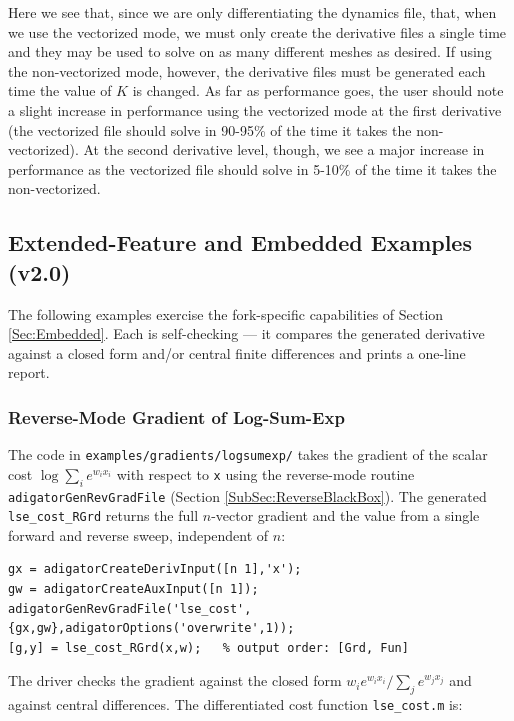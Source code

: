 \documentclass[10pt,pdftex]{article}
\begin{document}
Here we see that, since we are only differentiating the dynamics file, that, when we use the vectorized mode, we must only create the derivative files a single time and they may be used to solve on as many different meshes as desired. If using the non-vectorized mode, however, the derivative files must be generated each time the value of $K$ is changed. As far as performance goes, the user should note a slight increase in performance using the vectorized mode at the first derivative (the vectorized file should solve in 90-95\% of the time it takes the non-vectorized). At the second derivative level, though, we see a major increase in performance as the vectorized file should solve in 5-10\% of the time it takes the non-vectorized.

\subsection{Extended-Feature and Embedded Examples (v2.0)}
The following examples exercise the fork-specific capabilities of Section \ref{Sec:Embedded}. Each is self-checking --- it compares the generated derivative against a closed form and/or central finite differences and prints a one-line report.

\subsubsection{Reverse-Mode Gradient of Log-Sum-Exp}
The code in \texttt{examples/gradients/logsumexp/} takes the gradient of the scalar cost $\log\sum_i e^{w_i x_i}$ with respect to \texttt{x} using the reverse-mode routine \texttt{adigatorGenRevGradFile} (Section \ref{SubSec:ReverseBlackBox}). The generated \texttt{lse\_cost\_RGrd} returns the full $n$-vector gradient and the value from a single forward and reverse sweep, independent of $n$:
\begin{verbatim}
gx = adigatorCreateDerivInput([n 1],'x');
gw = adigatorCreateAuxInput([n 1]);
adigatorGenRevGradFile('lse_cost',{gx,gw},adigatorOptions('overwrite',1));
[g,y] = lse_cost_RGrd(x,w);   % output order: [Grd, Fun]
\end{verbatim}
The driver checks the gradient against the closed form $w_i e^{w_i x_i}/\sum_j e^{w_j x_j}$ and against central differences. The differentiated cost function \texttt{lse\_cost.m} is:

\end{document}
